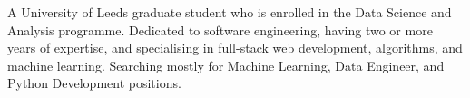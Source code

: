 

\begin{cvparagraph}

A University of Leeds graduate student who is enrolled in the Data Science and Analysis programme. Dedicated to software engineering, having two or more years of expertise, and specialising in full-stack web development, algorithms, and machine learning. Searching mostly for Machine Learning, Data Engineer, and Python Development positions.
\end{cvparagraph}